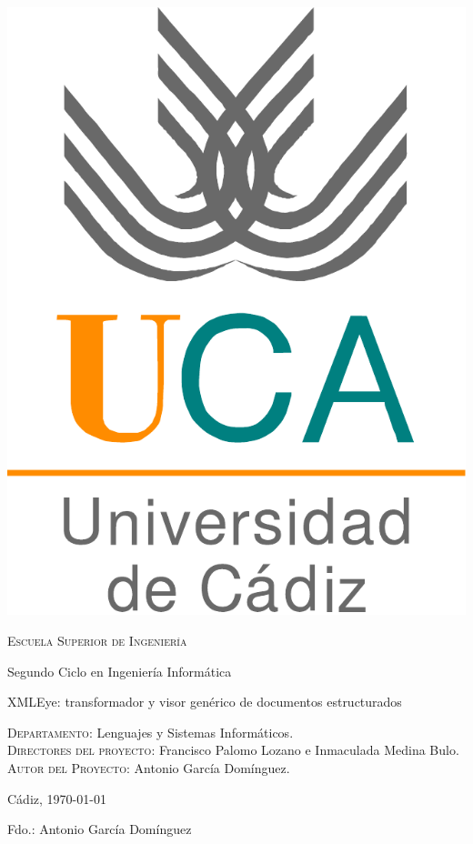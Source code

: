 \documentclass[a4paper,12pt,titlepage,halfparskip,cleardoubleempty]{scrbook}
\begin{document}
{
  \thispagestyle{empty}
  \centering
  \includegraphics[width=.2\textwidth]{logo_uca}

  \bigskip
  \bigskip
  \bigskip
  
  \begin{changemargin}{3em}{3em}

    \begin{center}
      {\Huge \textsc{\nohyphens{Escuela Superior de Ingeniería}}}
      
      \bigskip
      \bigskip
      
      {\huge \nohyphens{Segundo Ciclo en Ingeniería Informática}}
      
      \bigskip
      \bigskip
      \bigskip
      \bigskip
      
      {\LARGE \nohyphens{XMLEye: transformador y visor genérico de
          documentos estructurados}}
      
      \bigskip
      \bigskip
      \bigskip
      \bigskip
      
    \end{center}
  \end{changemargin}

  \begin{flushleft}
    \Large

    \textsc{Departamento}: \nohyphens{Lenguajes y Sistemas Informáticos.} \\
    \textsc{Directores del proyecto}: \nohyphens{Francisco Palomo Lozano e
      Inmaculada Medina Bulo.} \\
    \textsc{Autor del Proyecto}: \nohyphens{Antonio García Domínguez}. \\
  \end{flushleft}
  
  \bigskip
  \bigskip
  \bigskip
  
  \begin{flushright}
    \large
    Cádiz, \today
    
    Fdo.: Antonio García Domínguez
    
  \end{flushright}

}
\end{document}

